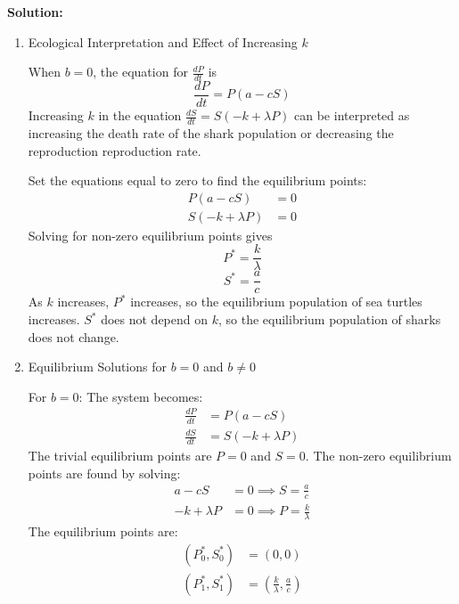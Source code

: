 \documentclass[12pt]{article}
\newenvironment{solution}{
    \textbf{Solution:}
    
}{
    
    \vspace{2em}
}
\begin{document}
\begin{solution}
    \begin{enumerate}
        \item Ecological Interpretation and Effect of Increasing \(k\)
        
        When \(b = 0\), the equation for \(\frac{dP}{dt}\) is
        \[
            \frac{dP}{dt} = P(a - cS)
        \]
        Increasing \(k\) in the equation \(\frac{dS}{dt} = S(-k + \lambda P)\) can be interpreted as increasing the  death rate of the shark population or decreasing the reproduction reproduction rate.

        Set the equations equal to zero to find the equilibrium points:
        \[
            \begin{aligned}
                P(a - cS) &= 0 \\
                S(-k + \lambda P) &= 0
            \end{aligned}
        \]
        Solving for non-zero equilibrium points gives
        \[
            P^* = \frac{k}{\lambda}
        \]
        \[
            S^* = \frac{a}{c}
        \]
        As \(k\) increases, \(P^*\) increases, so the equilibrium population of sea turtles increases. \(S^*\) does not depend on \(k\), so the equilibrium population of sharks does not change.

        \item Equilibrium Solutions for \(b = 0\) and \(b \neq 0\)

        For \(b = 0\):
        The system becomes:
        \[
            \begin{aligned}
                \frac{dP}{dt} &= P(a - cS) \\
                \frac{dS}{dt} &= S(-k + \lambda P)
            \end{aligned}
        \]
        The trivial equilibrium points are \(P = 0\) and \(S = 0\). The non-zero equilibrium points are found by solving:
        \[
            \begin{aligned}
                a - cS &= 0 \implies S = \frac{a}{c} \\
                -k + \lambda P &= 0 \implies P = \frac{k}{\lambda}
            \end{aligned}
        \]
        The equilibrium points are:
        \[
            \begin{aligned}
                \left( P_0^*, S_0^* \right) &= (0,0)\\
                \left( P_1^*, S_1^* \right) &= \left( \frac{k}{\lambda}, \frac{a}{c} \right) \\
            \end{aligned}
        \]


\end{enumerate}
\end{solution}
\end{document}
